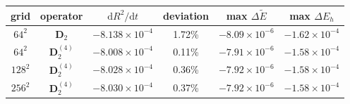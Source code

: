 \begin{tabular}{cc cccc}
\toprule
grid & operator & $\mathrm dR^2/\mathrm dt$ & deviation & max $\Delta\tilde E$ & max $\Delta E_h$\\
\midrule
$64^2$ & $\mathbf D_2$ & $-8.138{\times}10^{-4}$ & 1.72\% & $-8.09{\times}10^{-6}$ & $-1.62{\times}10^{-4}$\\
$64^2$ & $\mathbf D_2^{(4)}$ & $-8.008{\times}10^{-4}$ & 0.11\% & $-7.91{\times}10^{-6}$ & $-1.58{\times}10^{-4}$\\
$128^2$ & $\mathbf D_2^{(4)}$ & $-8.028{\times}10^{-4}$ & 0.36\% & $-7.92{\times}10^{-6}$ & $-1.58{\times}10^{-4}$\\
$256^2$ & $\mathbf D_2^{(4)}$ & $-8.030{\times}10^{-4}$ & 0.37\% & $-7.92{\times}10^{-6}$ & $-1.58{\times}10^{-4}$\\
\bottomrule
\end{tabular}
